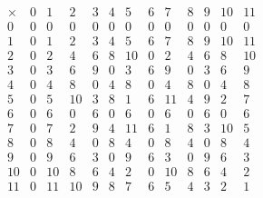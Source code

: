 \begin{solution}
\begin{equation}
\begin{array}{c|cccccccccccc}
        \times & 0 & 1 & 2 & 3 & 4 & 5 & 6 & 7 & 8 & 9 & 10 & 11 \\
        \hline
        0 & 0 & 0 & 0 & 0 & 0 & 0 & 0 & 0 & 0 & 0 & 0 & 0 \\
        1 & 0 & 1 & 2 & 3 & 4 & 5 & 6 & 7 & 8 & 9 & 10 & 11 \\
        2 & 0 & 2 & 4 & 6 & 8 & 10 & 0 & 2 & 4 & 6 & 8 & 10 \\
        3 & 0 & 3 & 6 & 9 & 0 & 3 & 6 & 9 & 0 & 3 & 6 & 9 \\
        4 & 0 & 4 & 8 & 0 & 4 & 8 & 0 & 4 & 8 & 0 & 4 & 8 \\
        5 & 0 & 5 & 10 & 3 & 8 & 1 & 6 & 11 & 4 & 9 & 2 & 7 \\
        6 & 0 & 6 & 0 & 6 & 0 & 6 & 0 & 6 & 0 & 6 & 0 & 6 \\
        7 & 0 & 7 & 2 & 9 & 4 & 11 & 6 & 1 & 8 & 3 & 10 & 5 \\
        8 & 0 & 8 & 4 & 0 & 8 & 4 & 0 & 8 & 4 & 0 & 8 & 4 \\
        9 & 0 & 9 & 6 & 3 & 0 & 9 & 6 & 3 & 0 & 9 & 6 & 3 \\
        10 & 0 & 10 & 8 & 6 & 4 & 2 & 0 & 10 & 8 & 6 & 4 & 2 \\
        11 & 0 & 11 & 10 & 9 & 8 & 7 & 6 & 5 & 4 & 3 & 2 & 1
      \end{array} 
    \end{equation}
  \end{solution}

